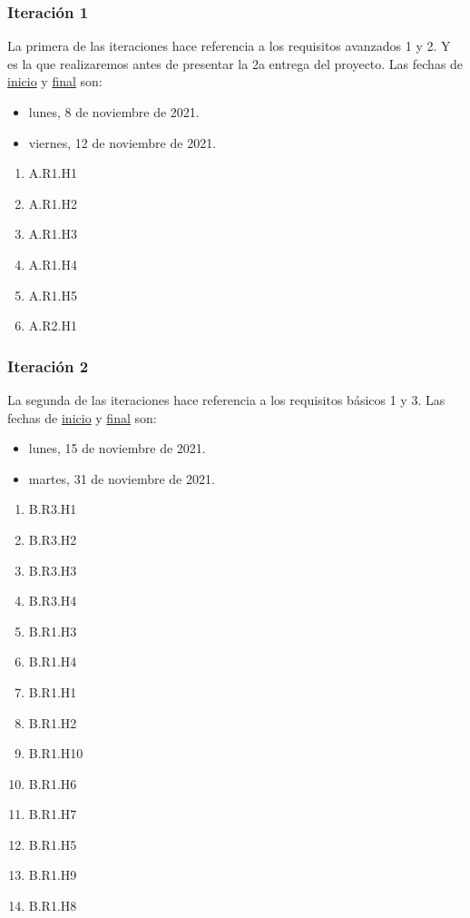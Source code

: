 \documentclass[../ei103948-project-documentation.tex]{subfiles}
\begin{document}
        \subsubsection{Iteración 1}
        La primera de las iteraciones hace referencia a los requisitos avanzados 1 y 2. Y es la que realizaremos antes de presentar la 2a entrega del proyecto. Las fechas de \underline{inicio} y \underline{final} son:
            \begin{itemize}
                \item [\faIcon{calendar-alt}] lunes, 8 de noviembre de 2021.
                \item [\faIcon{calendar-check}] viernes, 12 de noviembre de 2021.
            \end{itemize}
            \begin{enumerate}
                \item A.R1.H1
                \item A.R1.H2
                \item A.R1.H3
                \item A.R1.H4
                \item A.R1.H5
                \item A.R2.H1
                
            \end{enumerate}

        \subsubsection{Iteración 2}
        La segunda de las iteraciones hace referencia a los requisitos básicos 1 y 3. Las fechas de \underline{inicio} y \underline{final} son:
            \begin{itemize}
                \item [\faIcon{calendar-alt}] lunes, 15 de noviembre de 2021.
                \item [\faIcon{calendar-check}] martes, 31 de noviembre de 2021.
            \end{itemize}
            \begin{enumerate}
                \item B.R3.H1
                \item B.R3.H2
                \item B.R3.H3
                \item B.R3.H4
                \item B.R1.H3
                \item B.R1.H4
                \item B.R1.H1
                \item B.R1.H2
                \item B.R1.H10
                \item B.R1.H6
                \item B.R1.H7
                \item B.R1.H5
                \item B.R1.H9
                \item B.R1.H8
            \end{enumerate}
\end{document}

